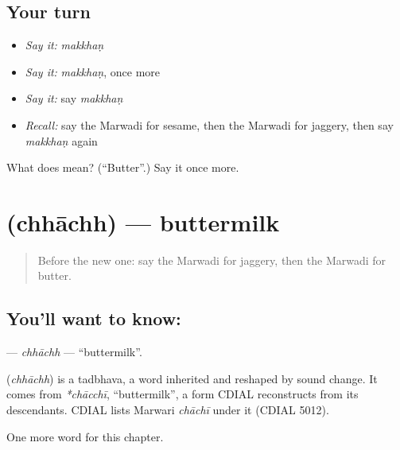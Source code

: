 \subsection*{Your turn}
\begin{itemize}
\raggedright
  \item \emph{Say it:} \emph{makkhaṇ}
  \item \emph{Say it:} \emph{makkhaṇ}, once more
  \item \emph{Say it:} say \emph{makkhaṇ}
  \item \emph{Recall:} say the Marwadi for sesame, then the Marwadi for jaggery, then say \emph{makkhaṇ} again
\end{itemize}

\begin{tcolorbox}[breakable,colback=teal!4,colframe=teal!35!black,title={Before you move on}]
What does  mean? (\textquotedblleft{}Butter\textquotedblright{}.) Say it once more.
\end{tcolorbox}
\section[\texorpdfstring{\mw{छाछ} (chhāchh)}{छाछ (chhāchh)}]{ (chhāchh) — buttermilk}

\label{lesson:MW-C134-chhachh}



\begin{quote}
Before the new one: say the Marwadi for jaggery, then the Marwadi for butter.
\end{quote}

\subsection*{You'll want to know: }
\textbf{} — \emph{chhāchh} — \textquotedblleft{}buttermilk\textquotedblright{}.

\begin{cousinweb}
\textbf{} (\emph{chhāchh}) is a tadbhava, a word inherited and reshaped by sound change. It comes from \emph{*chācchī}, \textquotedblleft{}buttermilk\textquotedblright{}, a form CDIAL reconstructs from its descendants. CDIAL lists Marwari \emph{chāchī} under it (CDIAL 5012).
\end{cousinweb}

\begin{grammarlens}[title={What you've built}]
One more word for this chapter.
\end{grammarlens}

